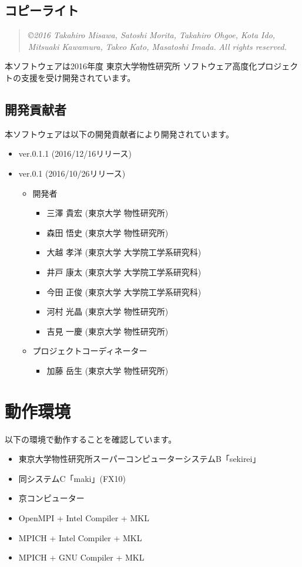\subsection{コピーライト}
\begin{quote}
{\it \copyright  2016 Takahiro Misawa, Satoshi Morita, Takahiro Ohgoe, Kota Ido, Mitsuaki Kawamura, Takeo Kato, Masatoshi Imada.} {\it All rights reserved.}
\end{quote}
本ソフトウェアは2016年度 東京大学物性研究所 ソフトウェア高度化プロジェクトの支援を受け開発されています。

\subsection{開発貢献者}
\label{subsec:developers}
本ソフトウェアは以下の開発貢献者により開発されています。
\begin{itemize}
\item{ver.0.1.1 (2016/12/16リリース)}
\item{ver.0.1 (2016/10/26リリース)}
\begin{itemize}
\item{開発者}
	\begin{itemize}
	\item{三澤 貴宏 (東京大学 物性研究所)}
	\item{森田 悟史 (東京大学 物性研究所)}
	\item{大越 孝洋 (東京大学 大学院工学系研究科)}
	\item{井戸 康太 (東京大学 大学院工学系研究科)}
	\item{今田 正俊 (東京大学 大学院工学系研究科)}
	\item{河村 光晶 (東京大学 物性研究所)}
	\item{吉見 一慶 (東京大学 物性研究所)}
	\end{itemize}

\item{プロジェクトコーディネーター}
	\begin{itemize}
	\item{加藤 岳生 (東京大学 物性研究所)}
	\end{itemize}

\end{itemize}

\end{itemize}


\section{動作環境}
 以下の環境で動作することを確認しています。
\begin{itemize}
\item 東京大学物性研究所スーパーコンピューターシステムB「sekirei」
\item 同システムC「maki」(FX10)
\item 京コンピューター
\item OpenMPI + Intel Compiler + MKL
\item MPICH + Intel Compiler + MKL
\item MPICH + GNU Compiler + MKL
\end{itemize}
